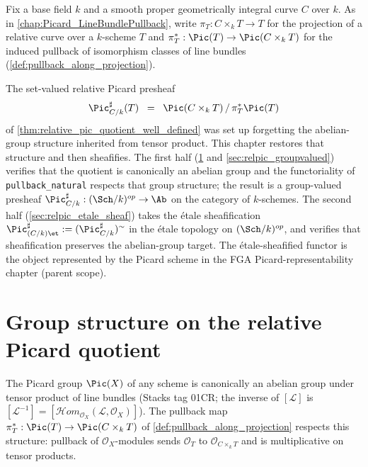 Fix a base field \(k\) and a smooth proper geometrically integral curve \(C\) over
\(k\). As in \cref{chap:Picard_LineBundlePullback}, write
\(\pi_T : C \times_k T \to T\) for the projection of a relative curve over a
\(k\)-scheme \(T\) and
\(\pi_T^* : \Pic(T) \to \Pic(C \times_k T)\) for the induced pullback of
isomorphism classes of line bundles (\cref{def:pullback_along_projection}).

The set-valued relative Picard presheaf
\[
  \Pic^\sharp_{C/k}(T) \;\;=\;\; \Pic(C \times_k T) \, / \, \pi_T^*\Pic(T)
\]
of \cref{thm:relative_pic_quotient_well_defined} was set up forgetting the
abelian-group structure inherited from tensor product. This chapter restores
that structure and then sheafifies. The first half (\cref{sec:relpic_group}
and \cref{sec:relpic_groupvalued}) verifies that the quotient is canonically
an abelian group and the functoriality of \texttt{pullback\_natural} respects
that group structure; the result is a group-valued presheaf
\(\Pic^\sharp_{C/k} : (\Sch/k)^{op} \to \Ab\) on the category of \(k\)-schemes. The
second half (\cref{sec:relpic_etale_sheaf}) takes the \'etale sheafification
\(\Pic^\sharp_{(C/k)\et} := (\Pic^\sharp_{C/k})^\sim\) in the \'etale topology on
\((\Sch/k)^{op}\), and verifies that sheafification preserves the abelian-group
target. The \'etale-sheafified functor is the object represented by the Picard
scheme in the FGA Picard-representability chapter (parent scope).

\section{Group structure on the relative Picard quotient}
\label{sec:relpic_group}

The Picard group \(\Pic(X)\) of any scheme is canonically an abelian group under
tensor product of line bundles (Stacks tag 01CR; the inverse of \([\mathcal{L}]\)
is $[\mathcal{L}^{-1}] = [\mathcal{H}om_{\mathcal{O}_X}(\mathcal{L},
\mathcal{O}_X)]$). The pullback map
\(\pi_T^* : \Pic(T) \to \Pic(C \times_k T)\) of
\cref{def:pullback_along_projection} respects this structure: pullback of
\(\mathcal{O}_X\)-modules sends \(\mathcal{O}_T\) to \(\mathcal{O}_{C \times_k T}\)
and is multiplicative on tensor products.

